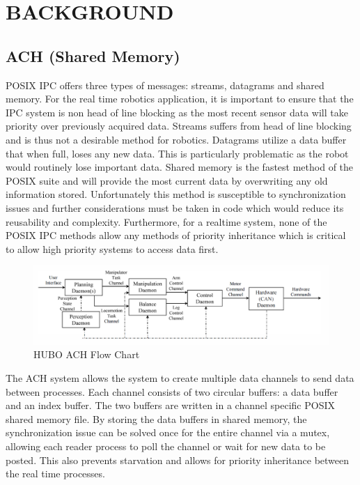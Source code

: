 \section{BACKGROUND}

\subsection{ACH (Shared Memory)}

POSIX IPC offers three types of messages: streams, datagrams and shared memory. For the real time robotics application, it is important to ensure that the IPC system is non head of line blocking as the most recent sensor data will take priority over previously acquired data. Streams suffers from head of line blocking and is thus not a desirable method for robotics. Datagrams utilize a data buffer that when full, loses any new data. This is particularly problematic as the robot would routinely lose important data. Shared memory is the fastest method of the POSIX suite and will provide the most current data by overwriting any old information stored. Unfortunately this method is susceptible to synchronization issues and further considerations must be taken in code which would reduce its reusability and complexity. Furthermore, for a realtime system, none of the POSIX IPC methods allow any methods of priority inheritance which is critical to allow high priority systems to access data first.


\begin{figure}[thpb]
 \centering
 \includegraphics[width=1.0\columnwidth]{./images/achflow.png}
  \caption{HUBO ACH Flow Chart}
  \label{fig:archr-sys-diagram}
\end{figure}

The ACH system allows the system to create multiple data channels to send data between processes. Each channel consists of two circular buffers: a data buffer and an index buffer. The two buffers are written in a channel specific POSIX shared memory file. By storing the data buffers in shared memory, the synchronization issue can be solved once for the entire channel via a mutex, allowing each reader process to poll the channel or wait for new data to be posted. This also prevents starvation and allows for priority inheritance between the real time processes.

